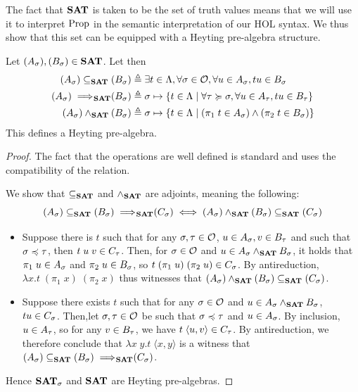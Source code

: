 \documentclass[a4paper,UKenglish,cleveref, autoref, thm-restate]{lipics-v2021}
\begin{document}
The fact that ${\mathbf{SAT}}$ is taken to be the set of truth values means that we will use it to interpret $\mathrm{Prop}$ in the semantic interpretation of our HOL syntax. We thus show that this set can be equipped with a Heyting pre-algebra structure.


\begin{proposition}
\label{prop:SAT}
  Let $(A_\sigma),(B_\sigma) \in {\mathbf{SAT}}$. Let then
  \begin{align*}
    (A_\sigma) \subseteq_{{\mathbf{SAT}}} (B_\sigma) &\triangleq \exists t \in \Lambda, \forall \sigma \in \mathcal O, \forall u \in A_{\sigma}, tu \in B_{\sigma}\\
    (A_\sigma) \implies\!\!\!_{{\mathbf{SAT}}} (B_\sigma) &\triangleq \sigma \mapsto \{ t \in \Lambda \mid \forall \tau \succcurlyeq \sigma, \forall u \in A_{\tau}, tu \in B_{\tau}\}\\
    (A_\sigma)\land_{{\mathbf{SAT}}}(B_\sigma) &\triangleq \sigma \mapsto \{ t \in \Lambda \mid (\pi_1\;t\in A_{\sigma}) \land (\pi_2\;t \in B_{\sigma})\}
  \end{align*}
  This defines a Heyting pre-algebra.
\end{proposition}
\begin{proof}

The fact that the operations are well defined is standard and uses the compatibility of the relation.
  

  We show that $\subseteq_{{\mathbf{SAT}}}$ and $\land_{{\mathbf{SAT}}}$ are adjoints, meaning the following:
  \[(A_\sigma) \subseteq_{{\mathbf{SAT}}} (B_\sigma) \implies\!\!\!_{{\mathbf{SAT}}} (C_\sigma) \iff (A_\sigma)\land_{{\mathbf{SAT}}} (B_\sigma)\subseteq_{{\mathbf{SAT}}} (C_\sigma)\]
  \begin{itemize}
  \item Suppose there is $t$ such that for any $\sigma,\tau\in\mathcal O$, $u \in A_{\sigma}, v \in B_{\tau}$ and such that $\sigma \preccurlyeq \tau$, then $t\;u\;v \in C_{\tau}$. Then, for $\sigma \in \mathcal O$ and $u \in A_{\sigma}\land_{{\mathbf{SAT}}}B_{\sigma}$, it holds that $\pi_1\;u\in A_{\sigma}$ and $\pi_2\;u\in B_{\sigma}$, so $t\;(\pi_1\;u)\;(\pi_2\;u)\in C_{\sigma}$. By antireduction, $\lambda x.t\;(\pi_1\;x)\;(\pi_2\;x)$ thus witnesses that $(A_\sigma) \land_{{\mathbf{SAT}}} (B_\sigma) \subseteq_{{\mathbf{SAT}}} (C_\sigma)$.
  \item Suppose there exists $t$ such that for any $\sigma\in\mathcal O$ and $u \in A_{\sigma} \land_{{\mathbf{SAT}}} B_{\sigma}$, $tu \in C_{\sigma}$. Then,\linebreak let \mbox{$\sigma,\tau\in\mathcal O$} be such that $\sigma\preccurlyeq \tau$ and $u \in A_{\sigma}$. By inclusion, $u \in A_{\tau}$, so for any $v \in B_{\tau}$, we have $t\;\langle u,v\rangle \in C_{\tau}$. By antireduction, we therefore conclude that $\lambda x\;y.t\;\langle x,y\rangle$ is a witness that \mbox{$(A_\sigma)\subseteq_{{\mathbf{SAT}}} (B_\sigma) \implies\!\!\!_{{\mathbf{SAT}}} (C_\sigma)$}.
  \end{itemize}
  Hence ${\mathbf{SAT}}_{\sigma}$ and ${\mathbf{SAT}}$ are Heyting pre-algebras.
\end{proof}
\end{document}
